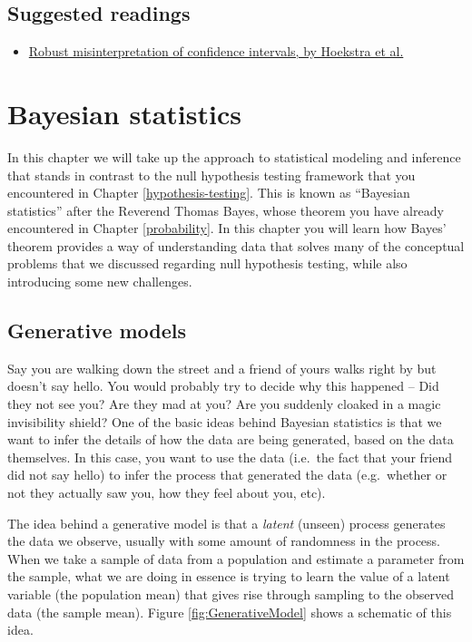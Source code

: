 \documentclass[12pt,]{book}
\providecommand{\tightlist}{%
  \setlength{\itemsep}{0pt}\setlength{\parskip}{0pt}}
\theoremstyle{definition}
\theoremstyle{definition}
\theoremstyle{definition}
\theoremstyle{remark}
\begin{document}
\hypertarget{suggested-readings-7}{%
\section{Suggested readings}\label{suggested-readings-7}}

\begin{itemize}
\tightlist
\item
  \href{http://www.ejwagenmakers.com/inpress/HoekstraEtAlPBR.pdf}{Robust misinterpretation of confidence intervals, by Hoekstra et al.}
\end{itemize}

\hypertarget{bayesian-statistics}{%
\chapter{Bayesian statistics}\label{bayesian-statistics}}

In this chapter we will take up the approach to statistical modeling and inference that stands in contrast to the null hypothesis testing framework that you encountered in Chapter \ref{hypothesis-testing}. This is known as ``Bayesian statistics'' after the Reverend Thomas Bayes, whose theorem you have already encountered in Chapter \ref{probability}. In this chapter you will learn how Bayes' theorem provides a way of understanding data that solves many of the conceptual problems that we discussed regarding null hypothesis testing, while also introducing some new challenges.

\hypertarget{generative-models}{%
\section{Generative models}\label{generative-models}}

Say you are walking down the street and a friend of yours walks right by but doesn't say hello. You would probably try to decide why this happened -- Did they not see you? Are they mad at you? Are you suddenly cloaked in a magic invisibility shield? One of the basic ideas behind Bayesian statistics is that we want to infer the details of how the data are being generated, based on the data themselves. In this case, you want to use the data (i.e.~the fact that your friend did not say hello) to infer the process that generated the data (e.g.~whether or not they actually saw you, how they feel about you, etc).

The idea behind a generative model is that a \emph{latent} (unseen) process generates the data we observe, usually with some amount of randomness in the process. When we take a sample of data from a population and estimate a parameter from the sample, what we are doing in essence is trying to learn the value of a latent variable (the population mean) that gives rise through sampling to the observed data (the sample mean). Figure \ref{fig:GenerativeModel} shows a schematic of this idea.
\end{document}
